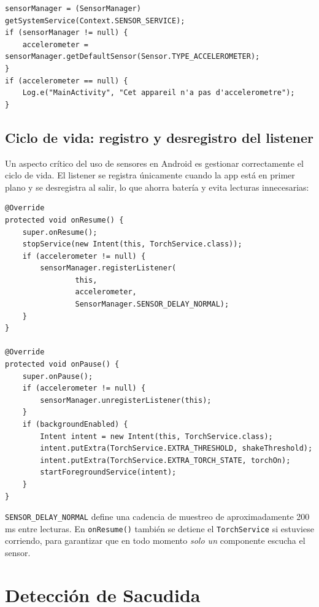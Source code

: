\documentclass[12pt, a4paper]{article}
\begin{document}
\begin{lstlisting}[caption={Inicializaci\'on del aceler\'ometro --- \texttt{MainActivity.java}}]
sensorManager = (SensorManager) getSystemService(Context.SENSOR_SERVICE);
if (sensorManager != null) {
    accelerometer = sensorManager.getDefaultSensor(Sensor.TYPE_ACCELEROMETER);
}
if (accelerometer == null) {
    Log.e("MainActivity", "Cet appareil n'a pas d'accelerometre");
}
\end{lstlisting}

\subsection{Ciclo de vida: registro y desregistro del listener}

Un aspecto cr\'itico del uso de sensores en Android es gestionar
correctamente el ciclo de vida. El listener se registra \'unicamente cuando
la app est\'a en primer plano y se desregistra al salir, lo que ahorra bater\'ia
y evita lecturas innecesarias:

\begin{lstlisting}[caption={Gesti\'on del ciclo de vida del sensor --- \texttt{MainActivity.java}}]
@Override
protected void onResume() {
    super.onResume();
    stopService(new Intent(this, TorchService.class));
    if (accelerometer != null) {
        sensorManager.registerListener(
                this,
                accelerometer,
                SensorManager.SENSOR_DELAY_NORMAL);
    }
}

@Override
protected void onPause() {
    super.onPause();
    if (accelerometer != null) {
        sensorManager.unregisterListener(this);
    }
    if (backgroundEnabled) {
        Intent intent = new Intent(this, TorchService.class);
        intent.putExtra(TorchService.EXTRA_THRESHOLD, shakeThreshold);
        intent.putExtra(TorchService.EXTRA_TORCH_STATE, torchOn);
        startForegroundService(intent);
    }
}
\end{lstlisting}

\texttt{SENSOR\_DELAY\_NORMAL} define una cadencia de muestreo de
aproximadamente 200\,ms entre lecturas. En \texttt{onResume()} tambi\'en se
detiene el \texttt{TorchService} si estuviese corriendo, para garantizar que
en todo momento \emph{solo un} componente escucha el sensor.

\section{Detecci\'on de Sacudida}
\end{document}
